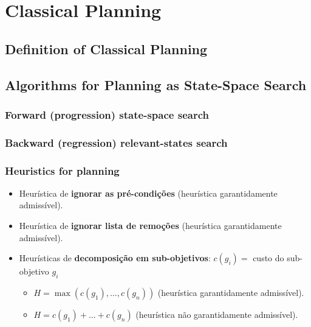 \documentclass[11pt]{article}
\begin{document}

\newpage
\setcounter{section}{9}
\section{Classical Planning}


\subsection{Definition of Classical Planning}



\subsection{Algorithms for Planning as State-Space Search}

\subsubsection{Forward (progression) state-space search}

\subsubsection{Backward (regression) relevant-states search}

\subsubsection{Heuristics for planning}

\begin{itemize}
    \item Heurística de \textbf{ignorar as pré-condições} (heurística garantidamente admissível).
    \item Heurística de \textbf{ignorar lista de remoções} (heurística garantidamente admissível).
    \item Heurísticas de \textbf{decomposição em sub-objetivos}:
    $c(g_i) =$ custo do sub-objetivo $g_i$
    \begin{itemize}
        \item $H = \max (c(g_1), \ldots, c(g_n))$ (heurística garantidamente admissível).
        \item $H = c(g_1)+\ldots +c(g_n)$ (heurística não garantidamente admissível).
    \end{itemize}
\end{itemize}
\end{document}
